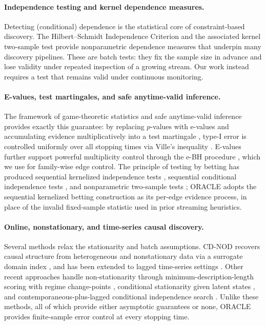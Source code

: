 \documentclass[preprint,12pt,authoryear]{elsarticle}
\begin{document}
\paragraph{Independence testing and kernel dependence measures.}
Detecting (conditional) dependence is the statistical core of constraint-based discovery. The Hilbert--Schmidt Independence Criterion \cite{gretton2005hsic} and the associated kernel two-sample test \cite{gretton2012mmd} provide nonparametric dependence measures that underpin many discovery pipelines. These are batch tests: they fix the sample size in advance and lose validity under repeated inspection of a growing stream. Our work instead requires a test that remains valid under continuous monitoring.

\paragraph{E-values, test martingales, and safe anytime-valid inference.}
The framework of game-theoretic statistics and safe anytime-valid inference \cite{ramdas2023savi} provides exactly this guarantee: by replacing $p$-values with e-values and accumulating evidence multiplicatively into a test martingale \cite{grunwald2024safetesting, ramdas2025evalues}, type-I error is controlled uniformly over all stopping times via Ville's inequality \cite{ville1939}. E-values further support powerful multiplicity control through the e-BH procedure \cite{wang2022ebh}, which we use for family-wise edge control. The principle of testing by betting has produced sequential kernelized independence tests \cite{podkopaev2023skit}, sequential conditional independence tests \cite{shaer2023modelx}, and nonparametric two-sample tests \cite{shekhar2023twosample}; ORACLE adopts the sequential kernelized betting construction as its per-edge evidence process, in place of the invalid fixed-sample statistic used in prior streaming heuristics.

\paragraph{Online, nonstationary, and time-series causal discovery.}
Several methods relax the stationarity and batch assumptions. CD-NOD recovers causal structure from heterogeneous and nonstationary data via a surrogate domain index \cite{huang2020cdnod}, and has been extended to lagged time-series settings \cite{sadeghi2025cdnots}. Other recent approaches handle non-stationarity through minimum-description-length scoring with regime change-points \cite{mameche2025spacetime}, conditional stationarity given latent states \cite{balsellsrodas2025sdci}, and contemporaneous-plus-lagged conditional independence search \cite{runge2020pcmciplus}. Unlike these methods, all of which provide either asymptotic guarantees or none, ORACLE provides finite-sample error control at every stopping time.
\end{document}
